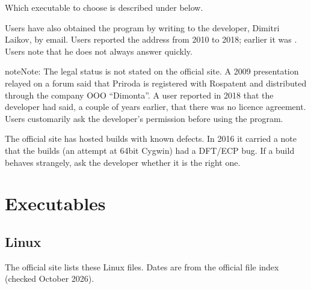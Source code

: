 \documentclass[letterpaper,10pt,english,openany,oneside]{sphinxmanual}
\begin{document}
\sphinxAtStartPar
Which executable to choose is described under {\hyperref[\detokenize{start/running:executables}]{}} below.

\sphinxAtStartPar
Users have also obtained the program by writing to the developer, Dimitri Laikov, by e\sphinxhyphen{}mail. Users reported the
address  from 2010 to 2018; earlier it was . Users note that he does not
always answer quickly.



\begin{sphinxadmonition}{note}{Note:}
\sphinxAtStartPar
The legal status is not stated on the official site. A 2009 presentation relayed on a forum said that Priroda is
registered with Rospatent and distributed through the company OOO “Dimonta”. A user reported in 2018 that the developer
had said, a couple of years earlier, that there was no licence agreement. Users customarily ask the developer’s
permission before using the program.
\end{sphinxadmonition}



\sphinxAtStartPar
The official site has hosted builds with known defects. In 2016 it carried a note that the  builds (an
attempt at 64\sphinxhyphen{}bit Cygwin) had a DFT/ECP bug. If a build behaves strangely, ask the developer whether it is the right one.




\section{Executables}
\label{\detokenize{start/running:executables}}\label{\detokenize{start/running:id2}}

\subsection{Linux}
\label{\detokenize{start/running:linux}}
\sphinxAtStartPar
The official site lists these Linux files. Dates are from the official file index (checked October 2026).
\end{document}
